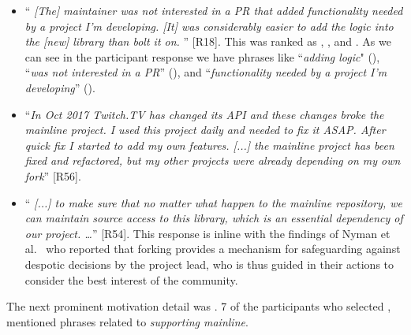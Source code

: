 \begin{itemize}[leftmargin=*]

\item ``\emph{%
[The] maintainer %
was not interested in a PR that added functionality needed by a project I'm developing. [It] was considerably easier to add the logic into the [new] library than bolt it on.%
}'' [R18]. This was ranked as , , and . As we can see in the participant response we have phrases like ``\textit{adding logic}" (), ``\textit{was not interested in a PR}'' (), and ``\textit{functionality needed by a project I'm developing}'' ().

\item ``\emph{In Oct 2017 Twitch.TV has changed its API and these changes broke the mainline project. I used this project daily and needed to fix it ASAP. After quick fix I started to add my own features. [...] the mainline project has been fixed and refactored, but my other projects were already depending on my own fork}'' [R56].

\item ``\emph{%
[...] to make sure that no matter what happen to the mainline repository, we can maintain source access to this library, which is an essential dependency of our project. \ldots}'' [R54]. This response is inline with the findings of Nyman et al.~\cite{Linus:2012Perspectives} who reported that forking provides a mechanism for safeguarding against despotic decisions by the project lead, who is thus guided in their actions to consider the best interest of the community.

\end{itemize}

\nd The next prominent  motivation detail was .
7 of the participants who selected , mentioned phrases related to \emph{supporting mainline}.

